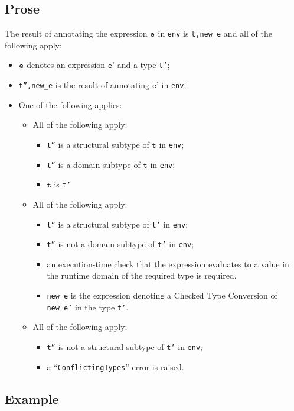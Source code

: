 \documentclass{book}
\newcommand\vt[0]{\texttt{t}}
\newcommand\vep[0]{\texttt{e'}}
\begin{document}
\begin{itemize}
  \subsection{Prose}
  The result of annotating the expression $\texttt{e}$ in \texttt{env} is
\texttt{t,new\_e} and all of the following apply:
  \begin{itemize}
  \item $\texttt{e}$ denotes an expression $\vep$ and a type \texttt{t'};
  \item \texttt{t'',new\_e} is the result of annotating $\vep$ in \texttt{env};
  \item One of the following applies:
    \begin{itemize}
    \item All of the following apply:
      \begin{itemize}
      \item \texttt{t''} is a structural subtype of $\vt$ in \texttt{env};
      \item \texttt{t''} is a domain subtype of $\vt$ in \texttt{env};
      \item $\vt$ is \texttt{t'}
      \end{itemize}
    \item All of the following apply:
      \begin{itemize}
      \item \texttt{t''} is a structural subtype of \texttt{t'} in \texttt{env};
      \item \texttt{t''} is not a domain subtype of \texttt{t'} in \texttt{env};
      \item an execution-time check that the expression evaluates to a value in the
        runtime domain of the required type is required.
      \item \texttt{new\_e} is the expression denoting a Checked Type
        Conversion of \texttt{new\_e'} in the type \texttt{t'}.
     \end{itemize}
   \item All of the following apply:
     \begin{itemize}
     \item \texttt{t''} is not a structural subtype of \texttt{t'} in \texttt{env};
     \item a ``\texttt{ConflictingTypes}'' error is raised.
     \end{itemize}
   \end{itemize}
  \end{itemize}

  \subsection{Example}



\end{itemize}
\end{document}
